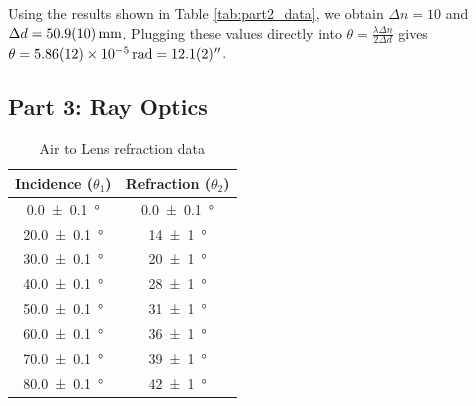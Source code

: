 \documentclass[a4paper]{scrartcl}
\begin{document}
Using the results shown in Table \ref{tab:part2_data}, we obtain \(\Delta n = 10\) and \(\Delta d = \SI{50.9 \pm 1.0}{\milli\metre}\). Plugging these values directly into \(\theta = \frac{\lambda \Delta n}{2 \Delta d}\) gives \(\theta = \SI{5.86 \pm 0.12e-5}{\radian} = \SI{12.1 \pm 0.2}{\arcsecond}\).

\subsection{Part 3: Ray Optics}
\begin{table}
    \centering
    \begin{tabular}{c | c}
        Incidence (\(\theta_1\)) & Refraction (\(\theta_2\)) \\
        \hline
        \SI{0.0 \pm 0.1}{\degree} & \SI{0.0 \pm 0.1}{\degree} \\
        \SI{20.0 \pm 0.1}{\degree} & \SI{14 \pm 1}{\degree} \\
        \SI{30.0 \pm 0.1}{\degree} & \SI{20 \pm 1}{\degree} \\
        \SI{40.0 \pm 0.1}{\degree} & \SI{28 \pm 1}{\degree} \\
        \SI{50.0 \pm 0.1}{\degree} & \SI{31 \pm 1}{\degree} \\
        \SI{60.0 \pm 0.1}{\degree} & \SI{36 \pm 1}{\degree} \\
        \SI{70.0 \pm 0.1}{\degree} & \SI{39 \pm 1}{\degree} \\
        \SI{80.0 \pm 0.1}{\degree} & \SI{42 \pm 1}{\degree} \\
        \hline
    \end{tabular}
    \caption{Air to Lens refraction data}
    \label{tab:part3_data}
\end{table}
\end{document}
